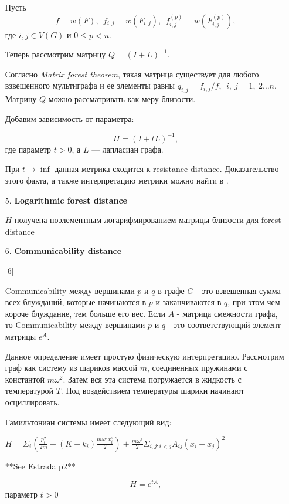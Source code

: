 \begin{itemize}
Пусть 
$$f = w(F),\ \  f_{i,j} = w(F_{i,j}),\ \  f_{i,j}^{(p)} = w(F_{i,j}^{(p)}),$$ 
где $i,j \in V(G)$ и $0 \le p < n$.

Теперь рассмотрим матрицу $Q = (I + L)^{-1}$.

Согласно \emph{Matrix forest theorem}, такая матрица существует для любого взвешенного мультиграфа и ее элементы равны $q_{i,j} = f_{i,j}/f,\ \ i,\ j = 1,\ 2\ldots n$. Матрицу $Q$ можно рассматривать как меру близости. 

Добавим зависимость от параметра:

\begin{equation}
H = (I + tL) ^{-1}, 
\end{equation} 
где параметр $t > 0$, а $L$ --- лапласиан графа.

При $t \to \inf$ данная метрика сходится к resistance distance. Доказательство этого факта, а также интерпретацию метрики можно найти в \cite{chebotarev2012walk}.

\item[5.] \textbf{Logarithmic forest distance}

$H$ получена поэлементным логарифмированием матрицы близости для forest distance

\item[6.] \textbf{Communicability distance}

[6]

Communicability между вершинами $p$ и $q$ в графе $G$ - это взвешенная сумма всех блужданий, которые начинаются в $p$ и заканчиваются в $q$, при этом чем короче блуждание, тем больше его вес. Если $A$ - матрица смежности графа, то Communicability между вершинами $p$ и $q$ - это соответствующий элемент матрицы $e^{A}$. 

Данное определение имеет простую физическую интерпретацию. Рассмотрим граф как систему из шариков массой $m$, соединенных пружинами с константой $m \omega ^2$. Затем вся эта система погружается в жидкость с температурой $T$. Под воздействием температуры шарики начинают осциллировать.

Гамильтониан системы имеет следующий вид:

$H = \Sigma _i (\frac{p_i^2}{2m} + (K-k_i)\frac{m\omega ^2 x_i^2}{2}) + \frac{m \omega ^2}{2} \Sigma _{i,j : i<j } A_{ij} (x_i-x_j)^2 $

**See Estrada p2**

\begin{equation}
H = e^{tA},
\end{equation}
 параметр $t > 0$


\end{itemize}
